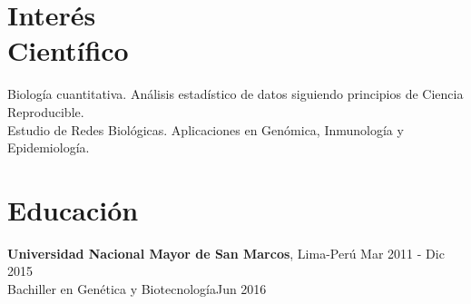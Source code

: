 \documentclass[margin,line]{res}
\begin{document}
	
	\address{Calle Tambo Huascar 201, San Miguel, Lima-Perú}
	\address{\textit{contacto:} avallecam@gmail.com o (+51)950951722}
	
	\begin{resume}
		
		\vspace*{.15in}
		
		\section{\sc Interés \\Científico} %
		
		
		Biología cuantitativa. Análisis estadístico de datos siguiendo principios de Ciencia Reproducible.\\ Estudio de Redes Biológicas. Aplicaciones en Genómica, Inmunología y Epidemiología.\\
				
		\section{\sc Educación}
		{\bf Universidad Nacional Mayor de San Marcos}, Lima-Perú \hfill Mar 2011 - Dic 2015\\
		Bachiller en Genética y Biotecnología\hfill Jun 2016\\
		

\end{resume}
\end{document}
